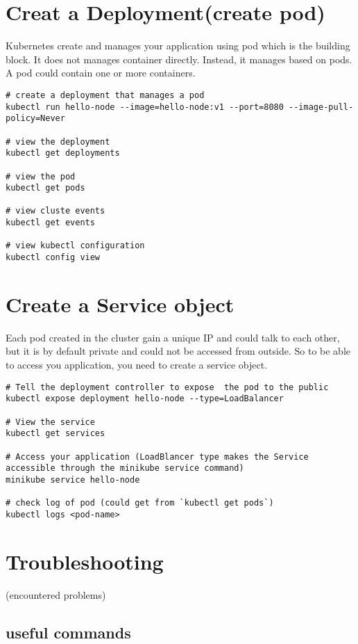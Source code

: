 \documentclass[11pt]{article}
\begin{document}
\section{Creat a Deployment(create pod)}
\label{sec:org3ea133a}
Kubernetes create and manages your application using pod which is the building block. It does not manages container directly. Instead, it manages based on pods. A pod could contain one or more containers.
\begin{verbatim}
# create a deployment that manages a pod
kubectl run hello-node --image=hello-node:v1 --port=8080 --image-pull-policy=Never

# view the deployment
kubectl get deployments

# view the pod
kubectl get pods

# view cluste events
kubectl get events

# view kubectl configuration
kubectl config view
\end{verbatim}

\section{Create a Service object}
\label{sec:org51e437d}
Each pod created in the cluster gain a unique IP and could talk to each other, but it is by default private and could not be accessed from outside. So to be able to access you application, you need to create a service object.
\begin{verbatim}
# Tell the deployment controller to expose  the pod to the public
kubectl expose deployment hello-node --type=LoadBalancer

# View the service
kubectl get services

# Access your application (LoadBlancer type makes the Service accessible through the minikube service command)
minikube service hello-node

# check log of pod (could get from `kubectl get pods`)
kubectl logs <pod-name>
\end{verbatim}
\section{Troubleshooting}
\label{sec:org17ea597}
(encountered problems)
\subsection{useful commands}
\label{sec:org956a312}
\end{document}

